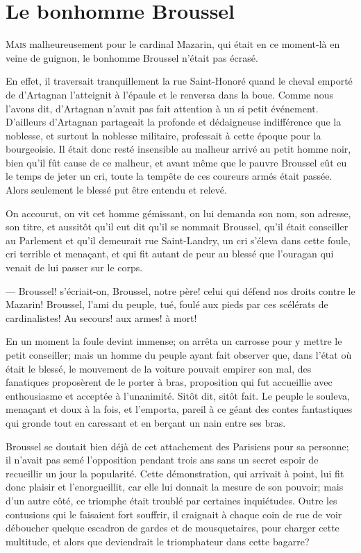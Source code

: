 \chapter{Le bonhomme Broussel}

\lettrine{M}{ais} malheureusement pour le cardinal Mazarin, qui était en ce moment-là en veine de guignon, le bonhomme Broussel n'était pas écrasé.

\zz
En effet, il traversait tranquillement la rue Saint-Honoré quand le cheval emporté de d'Artagnan l'atteignit à l'épaule et le renversa dans la boue. Comme nous l'avons dit, d'Artagnan n'avait pas fait attention à un si petit événement. D'ailleurs d'Artagnan partageait la profonde et dédaigneuse indifférence que la noblesse, et surtout la noblesse militaire, professait à cette époque pour la bourgeoisie. Il était donc resté insensible au malheur arrivé au petit homme noir, bien qu'il fût cause de ce malheur, et avant même que le pauvre Broussel eût eu le temps de jeter un cri, toute la tempête de ces coureurs armés était passée. Alors seulement le blessé put être entendu et relevé.

On accourut, on vit cet homme gémissant, on lui demanda son nom, son adresse, son titre, et aussitôt qu'il eut dit qu'il se nommait Broussel, qu'il était conseiller au Parlement et qu'il demeurait rue Saint-Landry, un cri s'éleva dans cette foule, cri terrible et menaçant, et qui fit autant de peur au blessé que l'ouragan qui venait de lui passer sur le corps.

— Broussel! s'écriait-on, Broussel, notre père! celui qui défend nos droits contre le Mazarin! Broussel, l'ami du peuple, tué, foulé aux pieds par ces scélérats de cardinalistes! Au secours! aux armes! à mort!

En un moment la foule devint immense; on arrêta un carrosse pour y mettre le petit conseiller; mais un homme du peuple ayant fait observer que, dans l'état où était le blessé, le mouvement de la voiture pouvait empirer son mal, des fanatiques proposèrent de le porter à bras, proposition qui fut accueillie avec enthousiasme et acceptée à l'unanimité. Sitôt dit, sitôt fait. Le peuple le souleva, menaçant et doux à la fois, et l'emporta, pareil à ce géant des contes fantastiques qui gronde tout en caressant et en berçant un nain entre ses bras.

Broussel se doutait bien déjà de cet attachement des Parisiens pour sa personne; il n'avait pas semé l'opposition pendant trois ans sans un secret espoir de recueillir un jour la popularité. Cette démonstration, qui arrivait à point, lui fit donc plaisir et l'enorgueillit, car elle lui donnait la mesure de son pouvoir; mais d'un autre côté, ce triomphe était troublé par certaines inquiétudes. Outre les contusions qui le faisaient fort souffrir, il craignait à chaque coin de rue de voir déboucher quelque escadron de gardes et de mousquetaires, pour charger cette multitude, et alors que deviendrait le triomphateur dans cette bagarre?

